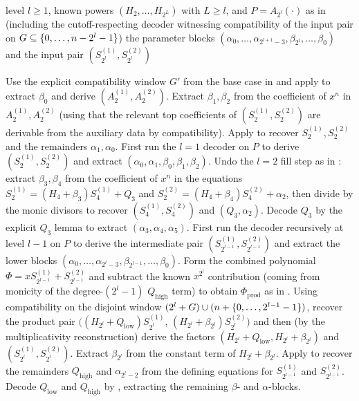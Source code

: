 \begin{algorithm}[H]
  \caption{Decoder summary for the fill construction $A_{2^l}$}\label{alg:decode-fill}
  \begin{algorithmic}
    \Require level $l\ge 1$, known powers $(H_2,\ldots,H_{2^L})$ with $L\ge l$, and $P=A_{2^l}(\cdot)$ as in  (including the cutoff-respecting decoder witnessing compatibility of the input pair on $G\subseteq\{0,\dotsc,n-2^l-1\}$)
    \Ensure the parameter blocks $(\alpha_0,\ldots,\alpha_{2^{l+1}-3},\beta_{2^l},\ldots,\beta_0)$ and the input pair $(S^{(1)}_{2^l},S^{(2)}_{2^l})$

      \State Use the explicit compatibility window $G'$ from the base case in  and apply  to extract $\beta_0$ and derive $(A^{(1)}_2,A^{(2)}_2)$.
      \State Extract $\beta_1,\beta_2$ from the coefficient of $x^n$ in $A^{(1)}_2,A^{(2)}_2$ (using that the relevant top coefficients of $(S^{(1)}_2,S^{(2)}_2)$ are derivable from the auxiliary data by compatibility).
      \State Apply  to recover $S^{(1)}_2,S^{(2)}_2$ and the remainders $\alpha_1,\alpha_0$.
      \State First run the $l=1$ decoder on $P$ to derive $(S^{(1)}_2,S^{(2)}_2)$ and extract $(\alpha_0,\alpha_1,\beta_0,\beta_1,\beta_2)$.
      \State Undo the $l=2$ fill step as in : extract $\beta_3,\beta_4$ from the coefficient of $x^n$ in the equations
      \(S^{(1)}_2=(H_4+\beta_3)S^{(1)}_4+Q_3\) and \(S^{(2)}_2=(H_4+\beta_4)S^{(2)}_4+\alpha_2\),
      then divide by the monic divisors to recover $(S^{(1)}_4,S^{(2)}_4)$ and $(Q_3,\alpha_2)$.
      \State Decode $Q_3$ by the explicit $Q_3$ lemma to extract $(\alpha_3,\alpha_4,\alpha_5)$.
    \Else {}
      \State First run the decoder recursively at level $l-1$ on $P$ to derive the intermediate pair $(S^{(1)}_{2^{l-1}},S^{(2)}_{2^{l-1}})$ and extract the lower blocks $(\alpha_0,\ldots,\alpha_{2^l-3},\beta_{2^{l-1}},\ldots,\beta_0)$.
      \State Form the combined polynomial $\Phi=xS^{(1)}_{2^{l-1}}+S^{(2)}_{2^{l-1}}$ and subtract the known $x^{2^l}$ contribution (coming from monicity of the degree-$(2^l-1)$ $Q_{\mathrm{high}}$ term) to obtain $\Phi_{\mathrm{prod}}$ as in .
      \State Using compatibility on the disjoint window $(2^l+G)\cup(n+\{0,\dotsc,2^{l-1}-1\})$, recover the product pair
      \(
        \bigl((H_{2^l}+Q_{\mathrm{low}})S^{(1)}_{2^l},\,(H_{2^l}+\beta_{2^l})S^{(2)}_{2^l}\bigr)
      \)
      and then (by the multiplicativity reconstruction) derive the factors $(H_{2^l}+Q_{\mathrm{low}},H_{2^l}+\beta_{2^l})$ and $(S^{(1)}_{2^l},S^{(2)}_{2^l})$.
      \State Extract $\beta_{2^l}$ from the constant term of $H_{2^l}+\beta_{2^l}$.
      \State Apply  to recover the remainders $Q_{\mathrm{high}}$ and $\alpha_{2^l-2}$ from the defining equations for $S^{(1)}_{2^{l-1}}$ and $S^{(2)}_{2^{l-1}}$.
      \State Decode $Q_{\mathrm{low}}$ and $Q_{\mathrm{high}}$ by , extracting the remaining $\beta$- and $\alpha$-blocks.
    \EndIf
  \end{algorithmic}
\end{algorithm}

